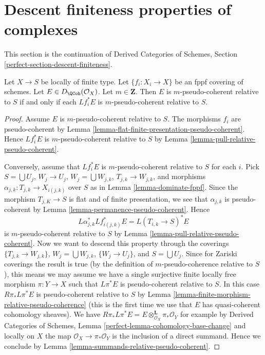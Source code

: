 \section{Descent finiteness properties of complexes}
\label{section-descent-finiteness}

\noindent
This section is the continuation of Derived Categories of Schemes,
Section \ref{perfect-section-descent-finiteness}.

\begin{lemma}
\label{lemma-relative-pseudo-coherent-descends-fppf}
Let $X \to S$ be locally of finite type.
Let $\{f_i : X_i \to X\}$ be an fppf covering of schemes.
Let $E \in D_\QCoh(\mathcal{O}_X)$. Let $m \in \mathbf{Z}$.
Then $E$ is $m$-pseudo-coherent relative to $S$
if and only if each $Lf_i^*E$ is $m$-pseudo-coherent relative to $S$.
\end{lemma}

\begin{proof}
Assume $E$ is $m$-pseudo-coherent relative to $S$.
The morphisms $f_i$ are pseudo-coherent by
Lemma \ref{lemma-flat-finite-presentation-pseudo-coherent}.
Hence $Lf_i^*E$ is $m$-pseudo-coherent relative to $S$
by Lemma \ref{lemma-pull-relative-pseudo-coherent}.

\medskip\noindent
Conversely, assume that $Lf_i^*E$ is $m$-pseudo-coherent relative to $S$
for each $i$. Pick $S = \bigcup U_j$, $W_j \to U_j$,
$W_j = \bigcup W_{j, k}$, $T_{j, k} \to W_{j, k}$, and
morphisms $\alpha_{j, k} : T_{j, k} \to X_{i(j, k)}$ over $S$ as in
Lemma \ref{lemma-dominate-fppf}.
Since the morphism $T_{j, K} \to S$ is flat and of finite presentation,
we see that $\alpha_{j, k}$ is pseudo-coherent by
Lemma \ref{lemma-permanence-pseudo-coherent}.
Hence
$$
L\alpha_{j, k}^*Lf_{i(j, k)}^*E = L(T_{i, k} \to S)^*E
$$
is $m$-pseudo-coherent relative to $S$ by
Lemma \ref{lemma-pull-relative-pseudo-coherent}.
Now we want to descend this property
through the coverings $\{T_{j, k} \to W_{j, k}\}$,
$W_j = \bigcup W_{j, k}$, $\{W_j \to U_j\}$, and $S = \bigcup U_j$.
Since for Zariski coverings the result is true
(by the definition of $m$-pseudo-coherence relative to $S$),
this means we may assume we have a single surjective
finite locally free morphism $\pi : Y \to X$
such that $L\pi^*E$ is pseudo-coherent relative to $S$.
In this case $R\pi_*L\pi^*E$ is pseudo-coherent relative to $S$
by Lemma \ref{lemma-finite-morphism-relative-pseudo-coherence}
(this is the first time we use that $E$ has quasi-coherent cohomology sheaves).
We have
$R\pi_*L\pi^*E = E \otimes^\mathbf{L}_{\mathcal{O}_X} \pi_*\mathcal{O}_Y$
for example by
Derived Categories of Schemes, Lemma
\ref{perfect-lemma-cohomology-base-change}
and locally on $X$ the map $\mathcal{O}_X \to \pi_*\mathcal{O}_Y$
is the inclusion of a direct summand. Hence we conclude by
Lemma \ref{lemma-summands-relative-pseudo-coherent}.
\end{proof}


